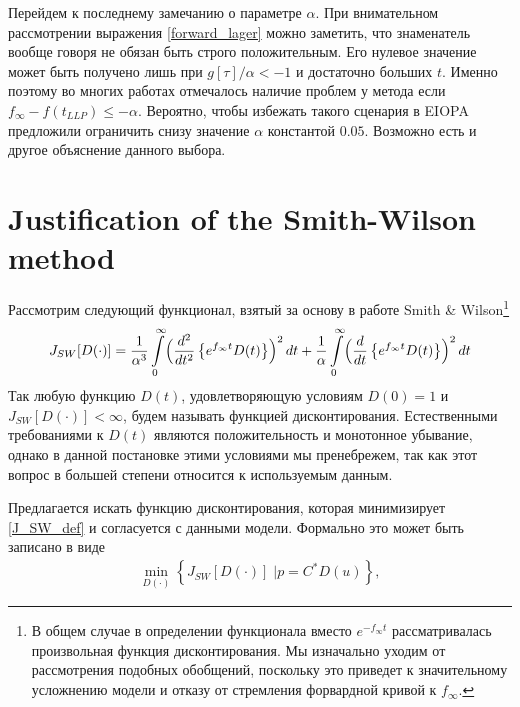 \documentclass[10pt]{article}
\theoremstyle{definition}
\theoremstyle{remark}
\theoremstyle{plain}
\newcommand{\w}{f_\infty}
\begin{document}
Перейдем к последнему замечанию о параметре $\alpha$. При внимательном рассмотрении выражения \eqref{forward_lager} можно заметить, что знаменатель вообще говоря не обязан быть строго положительным. Его нулевое значение может быть получено лишь при $g[\tau]/\alpha<-1$ и достаточно больших $t$. Именно поэтому во многих работах отмечалось наличие проблем у метода если $\w - f(t_{LLP})\leqslant -\alpha$. Вероятно, чтобы избежать такого сценария в EIOPA предложили ограничить снизу значение $\alpha$ константой $0.05$. Возможно есть и другое объяснение данного выбора.
\newpage

\section{Justification of the Smith-Wilson method}
Рассмотрим следующий функционал, взятый за основу в работе Smith \& Wilson\footnote{
В общем случае в определении функционала вместо $e^{-\w t}$ рассматривалась произвольная функция дисконтирования. Мы изначально уходим от рассмотрения подобных обобщений, поскольку это приведет к значительному усложнению модели и отказу от стремления форвардной кривой к $\w$.
}
\begin{align}
J_{SW}[D(\cdot)] = 
		\frac{1}{\alpha^3}
		\int\limits_0^\infty 
		\Bigl(
			\frac{d^2}{dt^2}
			\left\{
				e^{\w t} D(t)
			\right\}
		\Bigr)^2
		\, dt
		+
		\frac{1}{\alpha}
		\int\limits_0^\infty 
		\Bigl(
			\frac{d}{dt}
			\left\{
				e^{\w t} D(t)
			\right\}
		\Bigr)^2
		\, dt \label{J_SW_def}
\end{align}
Так любую функцию $D(t)$, удовлетворяющую условиям $D(0) = 1$ и $J_{SW}\left[D(\cdot)\right]<\infty$, будем называть функцией дисконтирования. Естественными требованиями к $D(t)$ являются положительность и монотонное убывание, однако в данной постановке этими условиями мы пренебрежем, так как этот вопрос в большей степени относится к используемым данным. 

Предлагается искать функцию дисконтирования, которая минимизирует \eqref{J_SW_def} и согласуется с данными модели. Формально это может быть записано в виде
\begin{align}
\min\limits_{D(\cdot)}
\left\{
	\left.
 		J_{SW}\left[D(\cdot)\right]\;
	\right|
	p = C^*D(u) 
\right\}, \label{Smooth_begin}
\end{align}
\end{document}
